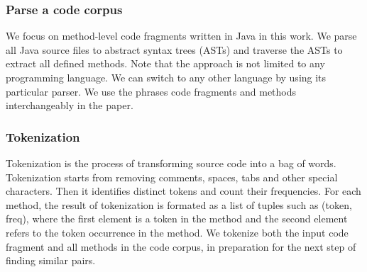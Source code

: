 \subsubsection{Parse a code corpus}
We focus on method-level code fragments written in Java in this work. We parse all Java source files to abstract syntax trees (ASTs) and traverse the ASTs to extract all defined methods. Note that the approach is not limited to any programming language. We can switch to any other language by using its particular parser. We use the phrases code fragments and methods interchangeably in the paper.

\subsubsection{Tokenization}
Tokenization is the process of transforming source code into a bag of words. Tokenization starts from removing comments, spaces, tabs and other special characters. Then it identifies distinct tokens and count their frequencies. For each method, the result of tokenization is formated as a list of tuples such as {\ttt (token, freq)}, where the first element is a token in the method and the second element refers to the token occurrence in the method.
We tokenize both the input code fragment and all methods in the code corpus, in preparation for the next step of finding similar pairs.

